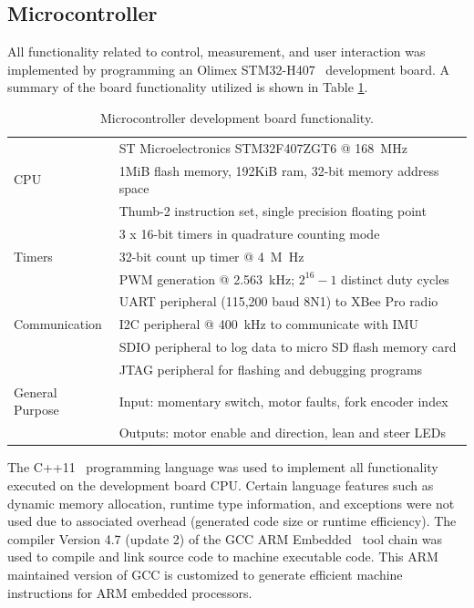 \subsection{Microcontroller} \label{rb:subsec:mcu} All functionality related to
control, measurement, and user interaction was implemented by programming an
Olimex STM32-H407~\cite{OlimexSTM32H407} development board. A summary of the
board functionality utilized is shown in Table \ref{rb:tab:mcu}.
\begin{table}[htbp]
  \centering
  \begin{tabular}{|l|l|}
    \hline
    & ST Microelectronics STM32F407ZGT6 @ \SI{168}{\MHz} \\
    CPU & 1MiB flash memory, 192KiB ram, 32-bit memory address space \\
        & Thumb-2 instruction set, single precision floating point \\
    \hline
           & 3 x 16-bit timers in quadrature counting mode \\
           Timers & 32-bit count up timer @ \SI{4}{M\Hz} \\
           & PWM generation @ \SI{2.563}{\kHz}; $2^{16} - 1$ distinct duty cycles \\
    \hline
                   & UART peripheral (115,200 baud 8N1) to XBee Pro radio \\
                   Communication  & I2C peripheral @ \SI{400}{\kHz} to communicate with IMU \\
                   & SDIO peripheral to log data to micro SD flash memory card \\
                   & JTAG peripheral for flashing and debugging programs \\
    \hline
    General Purpose & Input: momentary switch, motor faults, fork encoder index \\
                    & Outputs: motor enable and direction, lean and steer LEDs \\
    \hline
  \end{tabular}
  \caption{Microcontroller development board functionality.}
  \label{rb:tab:mcu}
\end{table}
The C++11~\cite{C++11} programming language was used to implement all
functionality executed on the development board CPU. Certain language features
such as dynamic memory allocation, runtime type information, and exceptions
were not used due to associated overhead (generated code size or runtime
efficiency). The compiler Version 4.7 (update 2) of the GCC ARM
Embedded~\cite{gccARMEmbedded} tool chain was used to compile and link source
code to machine executable code. This ARM maintained version of GCC is
customized to generate efficient machine instructions for ARM embedded
processors.

